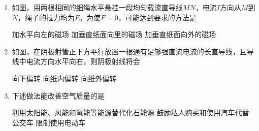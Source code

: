 \documentclass[\gkver]{gaokaozhenti}
\begin{document}
\begin{enumerate}
{磁感线总是由 N 极出发指向 S 极}
{某点磁场的方向与放在该点小磁针静止时 N 极所指方向一致}
{若在某区域内通电导线不受磁场力的作用，则该区域的磁感应强度一定为零}


\item
如图，用两根相同的细绳水平悬挂一段均匀载流直导线$MN$，电流$I$方向从$M$到$N$，绳子的拉力均为$F$。为使$F=0$，可能达到要求的方法是


{加水平向左的磁场}
{加垂直纸面向里的磁场}
{加垂直纸面向外的磁场}


\item
如图，在阴极射管正下方平行放置一根通有足够强直流电流的长直导线，且导线中电流方向水平向右，则阴极射线将会


{向下偏转}
{向纸内偏转}
{向纸外偏转}


\item
下述做法能改善空气质量的是

{利用太阳能、风能和氢能等能源替代化石能源}
{鼓励私人购买和使用汽车代替公交车}
{限制使用电动车}


\end{enumerate}
\end{document}
